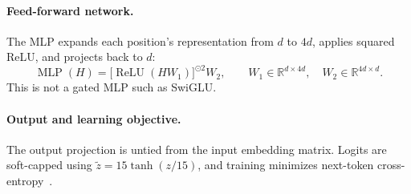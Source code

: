 \documentclass[11pt]{article}
\begin{document}
\paragraph{Feed-forward network.}
The MLP expands each position's representation from $d$ to $4d$, applies
squared ReLU, and projects back to $d$:
\begin{equation}
 \operatorname{MLP}(H)
 = \bigl[\operatorname{ReLU}(H W_1)\bigr]^{\odot 2}W_2,
 \qquad W_1\in\mathbb{R}^{d\times4d},\quad
 W_2\in\mathbb{R}^{4d\times d}.
\end{equation}
This is not a gated MLP such as SwiGLU.

\paragraph{Output and learning objective.}
The output projection is untied from the input embedding matrix. Logits are soft-capped using \(\widetilde z=15\tanh(z/15)\), and training minimizes next-token cross-entropy~\cite{nanochat-code}.
\end{document}
